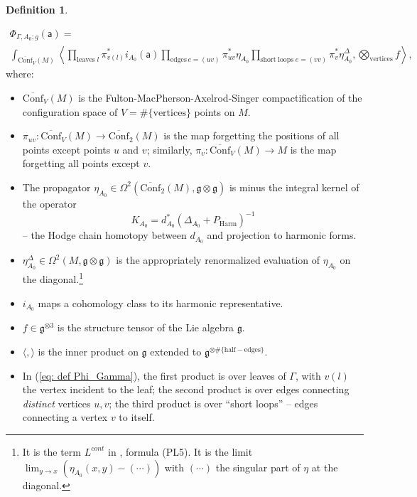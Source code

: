 \documentclass[11pt,a4paper]{amsart}
\theoremstyle{plain} %
\theoremstyle{definition}
\newtheorem{defn}[thm]{Definition}
\theoremstyle{remark}
\newcommand{\g}{\mathfrak{g}}
\newcommand{\mr}{\mathrm}
\newcommand{\sfa}{\mathsf{a}}
\newcommand{\ra}{\rightarrow}
\begin{document}
{\begin{defn}
\begin{itemize}
    \begin{multline}\label{eq: def Phi_Gamma}
        \Phi_{\Gamma,A_0;g}(\sfa)=\\
        \int_{\overline{\mr{Conf}}_V(M)} 
        \left\langle  \prod_{\mr{leaves}\; l} \pi^*_{v(l)}i_{A_0}(\sfa) \prod_{\mr{edges}\, e=(uv)} \pi_{uv}^*\eta_{A_0}
        \prod_{\mr{short\; loops}\; e=(vv)} \pi_v^* \eta_{A_0}^\Delta
        , \bigotimes_{\mr{vertices}} f \right\rangle,
    \end{multline}
    where: 
    \begin{itemize}
   \item  $\overline{\mr{Conf}}_V(M)$ is the Fulton-MacPherson-Axelrod-Singer compactification of the configuration space of $V=\#\{\mr{vertices}\}$ points on $M$. 
   \item $\pi_{uv}\colon \overline{\mr{Conf}}_V(M) \ra \overline{\mr{Conf}}_2(M)$   is the map forgetting the positions of all points except points $u$ and $v$; similarly,
   $\pi_v\colon \overline{\mr{Conf}}_V(M) \ra M$ is the map forgetting all points except $v$.
   \item The propagator $\eta_{A_0}\in \Omega^2(\overline{\mr{Conf}}_2(M),\g\otimes\g)$ is minus the integral kernel of the operator 
   \begin{equation}\label{eq: def K}
   K_{A_0}=d^*_{A_0}(\Delta_{A_0}+P_\mr{Harm})^{-1}
   \end{equation} -- the Hodge chain homotopy between $d_{A_0}$ and projection to harmonic forms.
   \item $\eta_{A_0}^\Delta\in \Omega^2(M,\g\otimes\g)$ is the appropriately renormalized evaluation of $\eta_{A_0}$ on the diagonal.\footnote{\label{footnote: tadpoles}
   It is the term $L^{cont}$ in \cite{Axelrod1991}, formula (PL5). It is the limit $\lim_{y\ra x} (\eta_{A_0}(x,y)-(\cdots))$ with $(\cdots)$ the singular part of $\eta$ at the diagonal. 
   }
   \item $i_{A_0}$ maps a cohomology class to its harmonic representative. 
   \item $f\in \g^{\otimes 3}$ is the structure tensor of the Lie algebra $\g$. 
   \item $\langle,\rangle$ is the inner product on $\g$ extended to $\g^{\otimes \#\{\mr{half-edges}\}}$.
   \item In (\ref{eq: def Phi_Gamma}), the first product is over leaves of $\Gamma$, with $v(l)$ the vertex incident to the leaf; the second product is over edges connecting \emph{distinct} vertices $u,v$; the third product is over ``short loops'' -- edges connecting a vertex $v$ to itself.

\end{itemize}
\end{itemize}
\end{defn}}
\end{document}
